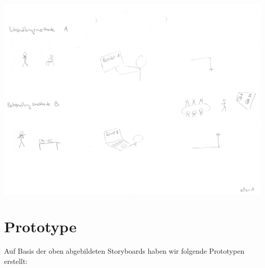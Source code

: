 \documentclass[a4paper]{scrreprt}
\begin{document}
\includegraphics[width=1\textwidth]{storyboards_personas_prototypes/iteration3/eller1_storyboard2.png}

\pagebreak
\section{Prototype}
Auf Basis der oben abgebildeten Storyboards haben wir folgende Prototypen erstellt:
\end{document}
